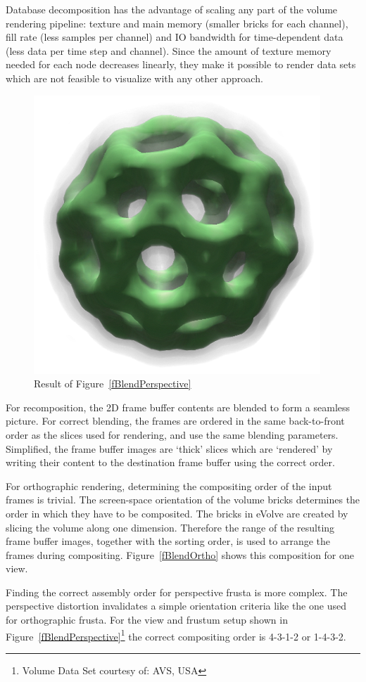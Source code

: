 \documentclass[10pt,a4]{scrartcl}
\newcommand{\fig}[1]{Figure~\ref{#1}}
\begin{document}
Database decomposition has the advantage of scaling any part of the volume
rendering pipeline: texture and main memory (smaller bricks for each channel),
fill rate (less samples per channel) and IO bandwidth for time-dependent data
(less data per time step and channel). Since the amount of texture memory needed
for each node decreases linearly, they make it possible to render data sets
which are not feasible to visualize with any other approach.

\begin{figure}
  \includegraphics[width=.382\textwidth]{images/volResult.png}
  {\caption{\label{fVolResult}Result of \fig{fBlendPerspective}}}
\end{figure}
For recomposition, the 2D frame buffer contents are blended to form a
seamless picture. For correct blending, the frames are ordered in the
same back-to-front order as the slices used for rendering, and use the
same blending parameters. Simplified, the frame buffer images are
`thick' slices which are `rendered' by writing their content to the
destination frame buffer using the correct order.

For orthographic rendering, determining the compositing order of the
input frames is trivial. The screen-space orientation of the volume
bricks determines the order in which they have to be composited. The
bricks in \textsf{eVolve} are created by slicing the volume along one
dimension. Therefore the range of the resulting frame buffer images,
together with the sorting order, is used to arrange the frames during
compositing. \fig{fBlendOrtho} shows this composition for one view.

Finding the correct assembly order for perspective frusta is more
complex. The perspective distortion invalidates a simple orientation
criteria like the one used for orthographic frusta. For the view and
frustum setup shown in \fig{fBlendPerspective}\footnote{Volume Data Set
  courtesy of: AVS, USA} the correct compositing order is 4-3-1-2 or
1-4-3-2.
\end{document}
